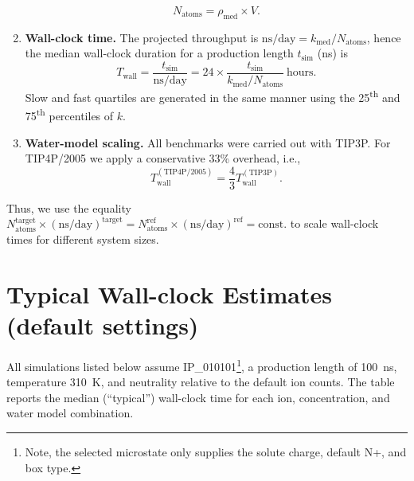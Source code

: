 \documentclass[a4paper,11pt]{article}
\begin{document}
\begin{enumerate}
    \begin{equation}
        N_{\mathrm{atoms}} = \rho_{\mathrm{med}} \times V.
    \end{equation}
    \item \textbf{Wall-clock time.} The projected throughput is $\mathrm{ns/day} = k_{\mathrm{med}} / N_{\mathrm{atoms}}$, hence the median wall-clock duration for a production length $t_{\mathrm{sim}}$ (ns) is
    \begin{equation}
        T_{\mathrm{wall}} = \frac{t_{\mathrm{sim}}}{\mathrm{ns/day}} = 24 \times \frac{t_{\mathrm{sim}}}{k_{\mathrm{med}} / N_{\mathrm{atoms}}}\ \text{hours}.
    \end{equation}
    Slow and fast quartiles are generated in the same manner using the 25\textsuperscript{th} and 75\textsuperscript{th} percentiles of $k$.
    \item \textbf{Water-model scaling.} All benchmarks were carried out with TIP3P. For TIP4P/2005 we apply a conservative 33\% overhead, i.e.,
    \begin{equation}
        T_{\mathrm{wall}}^{(\mathrm{TIP4P/2005})} = \frac{4}{3} T_{\mathrm{wall}}^{(\mathrm{TIP3P})}.
    \end{equation}
\end{enumerate}
Thus, we use the equality $N^{\mathrm{target}}_{\mathrm{atoms}} \times (\mathrm{ns/day})^{\mathrm{target}} = N^{\mathrm{ref}}_{\mathrm{atoms}} \times (\mathrm{ns/day})^{\mathrm{ref}} = \text{const.}$ to scale wall-clock times for different system sizes.

\section{Typical Wall-clock Estimates (default settings)}
All simulations listed below assume IP\_010101\footnote{Note, the selected microstate only supplies the solute charge, default N+, and box type.}, a production length of \SI{100}{ns}, temperature \SI{310}{K}, and neutrality relative to the default ion counts. The table reports the median (``typical'') wall-clock time for each ion, concentration, and water model combination.
\end{document}
